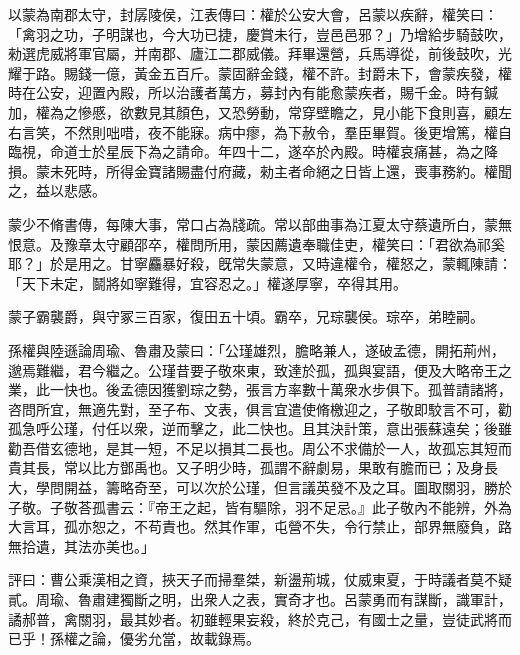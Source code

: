 \begin{pinyinscope}
以蒙為南郡太守，封孱陵侯，江表傳曰：權於公安大會，呂蒙以疾辭，權笑曰：「禽羽之功，子明謀也，今大功已捷，慶賞未行，豈邑邑邪？」乃增給步騎鼓吹，勑選虎威將軍官屬，并南郡、廬江二郡威儀。拜畢還營，兵馬導從，前後鼓吹，光耀于路。賜錢一億，黃金五百斤。蒙固辭金錢，權不許。封爵未下，會蒙疾發，權時在公安，迎置內殿，所以治護者萬方，募封內有能愈蒙疾者，賜千金。時有鍼加，權為之慘慼，欲數見其顏色，又恐勞動，常穿壁瞻之，見小能下食則喜，顧左右言笑，不然則咄唶，夜不能寐。病中瘳，為下赦令，羣臣畢賀。後更增篤，權自臨視，命道士於星辰下為之請命。年四十二，遂卒於內殿。時權哀痛甚，為之降損。蒙未死時，所得金寶諸賜盡付府藏，勑主者命絕之日皆上還，喪事務約。權聞之，益以悲感。

蒙少不脩書傳，每陳大事，常口占為牋疏。常以部曲事為江夏太守蔡遺所白，蒙無恨意。及豫章太守顧邵卒，權問所用，蒙因薦遺奉職佳吏，權笑曰：「君欲為祁奚耶？」於是用之。甘寧麤暴好殺，旣常失蒙意，又時違權令，權怒之，蒙輒陳請：「天下未定，鬬將如寧難得，宜容忍之。」權遂厚寧，卒得其用。

蒙子霸襲爵，與守冢三百家，復田五十頃。霸卒，兄琮襲侯。琮卒，弟睦嗣。

孫權與陸遜論周瑜、魯肅及蒙曰：「公瑾雄烈，膽略兼人，遂破孟德，開拓荊州，邈焉難繼，君今繼之。公瑾昔要子敬來東，致達於孤，孤與宴語，便及大略帝王之業，此一快也。後孟德因獲劉琮之勢，張言方率數十萬衆水步俱下。孤普請諸將，咨問所宜，無適先對，至子布、文表，俱言宜遣使脩檄迎之，子敬即駮言不可，勸孤急呼公瑾，付任以衆，逆而擊之，此二快也。且其決計策，意出張蘇遠矣；後雖勸吾借玄德地，是其一短，不足以損其二長也。周公不求備於一人，故孤忘其短而貴其長，常以比方鄧禹也。又子明少時，孤謂不辭劇易，果敢有膽而已；及身長大，學問開益，籌略奇至，可以次於公瑾，但言議英發不及之耳。圖取關羽，勝於子敬。子敬荅孤書云：『帝王之起，皆有驅除，羽不足忌。』此子敬內不能辨，外為大言耳，孤亦恕之，不苟責也。然其作軍，屯營不失，令行禁止，部界無廢負，路無拾遺，其法亦美也。」

評曰：曹公乘漢相之資，挾天子而掃羣桀，新盪荊城，仗威東夏，于時議者莫不疑貳。周瑜、魯肅建獨斷之明，出衆人之表，實奇才也。呂蒙勇而有謀斷，識軍計，譎郝普，禽關羽，最其妙者。初雖輕果妄殺，終於克己，有國士之量，豈徒武將而已乎！孫權之論，優劣允當，故載錄焉。


\end{pinyinscope}